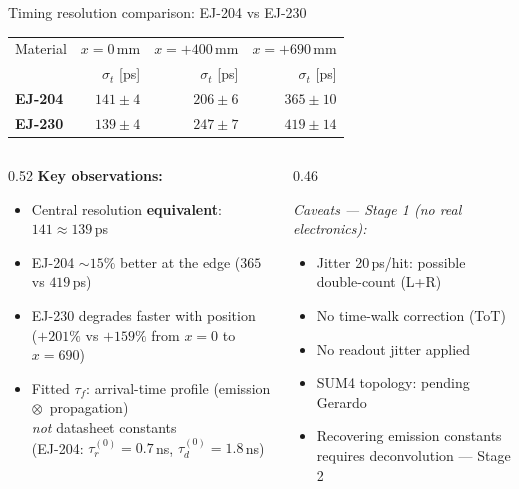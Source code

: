 \documentclass[aspectratio=169,9pt]{beamer}
\begin{document}
\begin{frame}{Timing resolution comparison: EJ-204 vs EJ-230}
  \begin{center}
    \large
    \begin{tabular}{lrrr}
      \toprule
      Material & $x=0$\,mm & $x=+400$\,mm & $x=+690$\,mm \\
               & $\sigma_t$ [ps] & $\sigma_t$ [ps] & $\sigma_t$ [ps] \\
      \midrule
      \textcolor{ej204col}{\textbf{EJ-204}} & $141\pm4$ & $206\pm6$ & $365\pm10$ \\
      \textcolor{ej230col}{\textbf{EJ-230}} & $139\pm4$ & $247\pm7$ & $419\pm14$ \\
      \bottomrule
    \end{tabular}
  \end{center}
  \vspace{0.4em}
  \begin{columns}[T]
    \begin{column}{0.52\textwidth}
      \textbf{Key observations:}
      \begin{itemize}
        \item Central resolution \textbf{equivalent}: $141\approx139$\,ps
        \item EJ-204 $\sim15\%$ better at the edge ($365$ vs $419$\,ps)
        \item EJ-230 degrades faster with position\\
              ($+201\%$ vs $+159\%$ from $x=0$ to $x=690$)
        \item Fitted $\tau_f$: arrival-time profile (emission $\otimes$\ propagation)\\
              \textit{not} datasheet constants\\
              (EJ-204: $\tau_r^{(0)}=0.7$\,ns, $\tau_d^{(0)}=1.8$\,ns)
      \end{itemize}
    \end{column}
    \begin{column}{0.46\textwidth}
      {\small \color{gray}
      \textit{Caveats — Stage 1 (no real electronics):}
      \begin{itemize}
        \item Jitter 20\,ps/hit: possible double-count (L+R)
        \item No time-walk correction (ToT)
        \item No readout jitter applied
        \item SUM4 topology: pending Gerardo
        \item Recovering emission constants\\
              requires deconvolution — Stage 2
      \end{itemize}
      }
    \end{column}
  \end{columns}
\end{frame}
\end{document}
